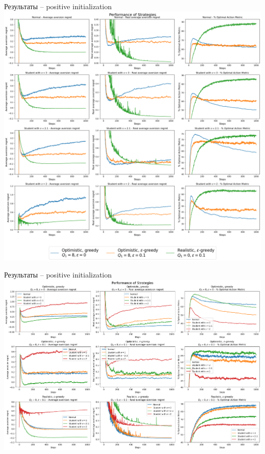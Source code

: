 \documentclass[11pt]{beamer} %
\begin{document}
    \begin{frame}{Результаты -- positive initialization}
        \includegraphics[scale=0.13,center]{images/theory_images/positive_init/one_distr.png}
    \end{frame}
    \begin{frame}{Результаты -- positive initialization}
        \includegraphics[scale=0.13,center]{images/theory_images/positive_init/one_strat.png}
    \end{frame}
\end{document}
